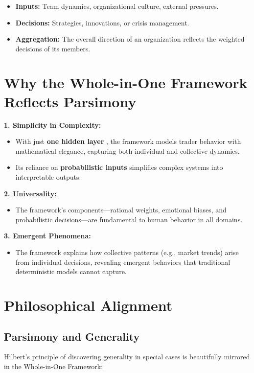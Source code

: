 \documentclass[a4]{article}
\newcommand{\bn}{\bigskip\noindent}
\begin{document}
\begin{itemize}
\item   {\bf Inputs:}  Team dynamics, organizational culture, external pressures.
\item  {\bf Decisions:}  Strategies, innovations, or crisis management.
\item {\bf Aggregation:}  The overall direction of an organization reflects the weighted decisions of its members.
\end{itemize}


\section{Why the Whole-in-One Framework Reflects Parsimony}

\bn
 {\bf 1. Simplicity in Complexity:} 

\begin{itemize}
\item  With just {\bf one hidden layer} , the framework models trader behavior with mathematical elegance, capturing both individual and collective dynamics.
\item Its reliance on {\bf probabilistic inputs}  simplifies complex systems into interpretable outputs.
\end{itemize}

\bn
 {\bf 2. Universality:} 

\begin{itemize}
\item The framework's components---rational weights, emotional biases, and probabilistic decisions---are fundamental to human behavior in all domains.
\end{itemize}

\bn
 {\bf 3. Emergent Phenomena:} 

\begin{itemize}
\item  The framework explains how collective patterns (e.g., market trends) arise from individual decisions, revealing emergent behaviors that traditional deterministic models cannot capture.
\end{itemize}


\section{Philosophical Alignment}

\subsection{Parsimony and Generality} 
Hilbert's principle of discovering generality in special cases is beautifully mirrored in the Whole-in-One Framework:
\end{document}

